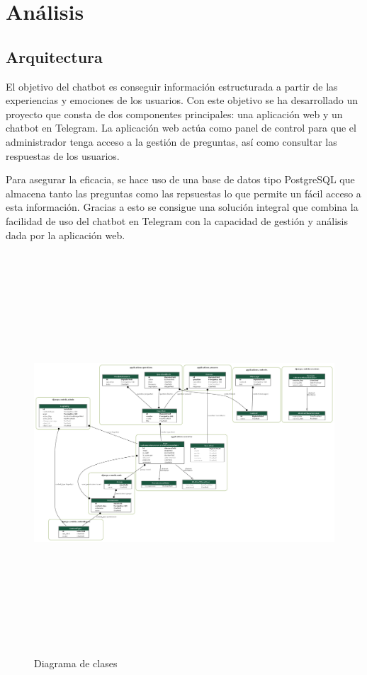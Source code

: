 \chapter{Análisis}

\section{Arquitectura}
El objetivo del chatbot es conseguir información estructurada a partir de las experiencias y emociones de los usuarios. Con este objetivo se ha desarrollado un proyecto que consta de dos componentes principales: una aplicación web y un chatbot en Telegram. La aplicación web actúa como panel de control para que el administrador tenga acceso a la gestión de preguntas, así como consultar las respuestas de los usuarios. 

Para asegurar la eficacia, se hace uso de una base de datos tipo PostgreSQL que almacena tanto las preguntas como las repsuestas lo que permite un fácil acceso a esta información. Gracias a esto se consigue una solución integral que combina la facilidad de uso del chatbot en Telegram con la capacidad de gestión y análisis dada por la aplicación web. \vspace{7cm}


\begin{figure}[!ht]
    \centering
    \includegraphics[width=1\textwidth, height=15cm]{imagenes/myapp_models.png}
    \caption{ Diagrama de clases }
    \label{fig:diagrama}
\end{figure}



